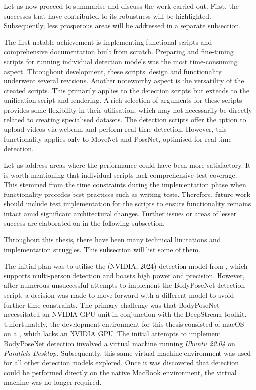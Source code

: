 
Let us now proceed to summarise and discuss the work carried out. First, the successes that have contributed to its robustness will be highlighted. Subsequently, less prosperous areas will be addressed in a separate subsection.

The first notable achievement is implementing functional scripts and comprehensive documentation built from scratch. Preparing and fine-tuning scripts for running individual detection models was the most time-consuming aspect. Throughout development, these scripts' design and functionality underwent several revisions. Another noteworthy aspect is the versatility of the created scripts. This primarily applies to the detection scripts but extends to the unification script and rendering. A rich selection of arguments for these scripts provides some flexibility in their utilisation, which may not necessarily be directly related to creating specialised datasets. The detection scripts offer the option to upload videos via webcam and perform real-time detection. However, this functionality applies only to MoveNet and PoseNet, optimised for real-time detection.

Let us address areas where the performance could have been more satisfactory. It is worth mentioning that individual scripts lack comprehensive test coverage. This stemmed from the time constraints during the implementation phase when functionality precedes best practices such as writing tests. Therefore, future work should include test implementation for the scripts to ensure functionality remains intact amid significant architectural changes. Further issues or areas of lesser success are elaborated on in the following subsection.

Throughout this thesis, there have been many technical limitations and im\-plementation struggles. This subsection will list some of them.

The initial plan was to utilise the  (NVIDIA, 2024) detection model from , which supports multi-person detection and boasts high power and precision. However, after numerous unsuccessful attempts to implement the BodyPoseNet detection script, a decision was made to move forward with a different model to avoid further time constraints. The primary challenge was that BodyPoseNet necessitated an NVIDIA GPU unit in conjunction with the DeepStream toolkit. Unfortunately, the development environment for this thesis consisted of macOS  on a , which lacks an NVIDIA GPU. The initial attempts to implement BodyPoseNet detection involved a virtual machine running {\em Ubuntu 22.04} on {\em Parallels Desktop}. Subsequently, this same virtual machine environment was used for all other detection models explored. Once it was discovered that detection could be performed directly on the native MacBook environment, the virtual machine was no longer required.

